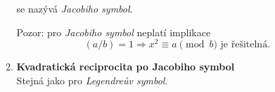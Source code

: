 \documentclass[12pt,a4paper]{article}
\begin{document}
\begin{enumerate}[leftmargin=*]
\begin{enumerate}
			se nazývá \textit{Jacobiho symbol}.

			Pozor: pro \textit{Jacobiho symbol} neplatí implikace
			\[ (a/b) = 1 \Rightarrow x^2 \equiv a \pmod{b} \text{ je řešitelná.} \]

		\item \textbf{Kvadratická reciprocita po Jacobiho symbol}\\
			Stejná jako pro \textit{Legendreův symbol}.

	\end{enumerate}

\end{enumerate}
\end{document}

